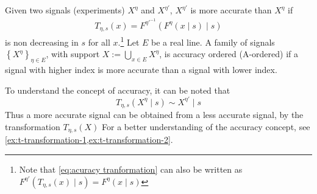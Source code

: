 \documentclass[10pt,a4paper]{article} 					%
\begin{document}
\begin{defn}\label{def:accuracy}
\parencite{Persico2000} Given two signals (experiments) \(X^{\eta}\) and \(X^{\eta'}\),  \(X^{\eta'}\) is more accurate than \(X^{\eta}\) if
\begin{align}
    	T_{\eta,s}(x)=F^{\eta'^{-1}}(F^{\eta}(x\mid s)\mid s)\label{eq:acuracy tranformation}
\end{align}
is non decreasing in \(s\) for all \(x\).\footnote{Note that \cref{eq:acuracy tranformation} can also be written as \(F^{\eta'}(T_{\eta,s}(x)\mid s)=F^{\eta}(x\mid s)\)} Let \(E\) be a real line. A family of signals \(\left \{ X^{\eta}\right \} _{\eta\in E}\), with support \(X:=\bigcup_{x\in E}X^\eta\), is accuracy ordered (A-ordered) if a signal with higher index is more accurate than a signal with lower index.
\end{defn}

To understand the concept of accuracy, it can be noted that
\[
	T_{\eta,s}(X^{\eta}\mid s)\sim X^{\eta'}\mid s
\]
Thus a more accurate signal can be obtained from a less accurate signal, by the transformation \(T_{\eta,s}(X)\)  For a better understanding of the accuracy concept, see \cref{ex:t-transformation-1,ex:t-transformation-2}.
\end{document}

